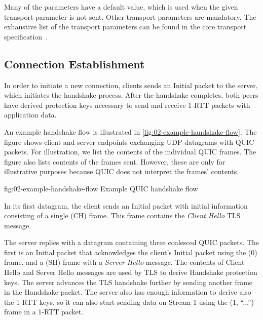 Many of the parameters have a default value, which is used when the given transport parameter is not
sent. Other transport parameters are mandatory. The exhaustive list of the transport parameters can be found in the core transport specification~\cite[Section~7.4]{draft-ietf-quic-transport}.

\subsection{Connection Establishment}\label{sec:02-connection-establishment}

In order to initiate a new connection, clients sends an Initial packet to the server, which
initiates the handshake process. After the handshake completes, both peers have derived protection
keys necessary to send and receive 1-RTT packets with application data.

An example handshake flow is illustrated in \autoref{fig:02-example-handshake-flow}. The figure
shows client and server endpoints exchanging UDP datagrams with QUIC packets. For illustration, we
list the contents of the individual QUIC frames. The figure also lists contents of the \CRYPTO{}
frames sent. However, these are only for illustrative purposes because QUIC does not interpret the
\CRYPTO{} frames' contents.

\begin{myFigure} {fig:02-example-handshake-flow} {Example QUIC handshake flow}

\resizebox{\linewidth}{!}{}

\end{myFigure}

In its first datagram, the client sends an Initial packet with initial information consisting of a
single \CRYPTO{}(CH) frame. This frame contains the \textit{Client Hello} TLS message.

The server replies with a datagram containing three coalesced QUIC packets. The first is an Initial
packet that acknowledges the client's Initial packet using the \ACK{}(0) frame, and a \CRYPTO{}(SH)
frame with a \textit{Server Hello} message. The contents of Client Hello and Server Hello messages
are used by TLS to derive Handshake protection keys. The server advances the TLS handshake further
by sending another \CRYPTO{} frame in the Handshake packet. The server also has enough information
to derive also the 1-RTT keys, so it can also start sending data on Stream 1 using the \STREAM{}(1,
``...'') frame in a 1-RTT packet.


